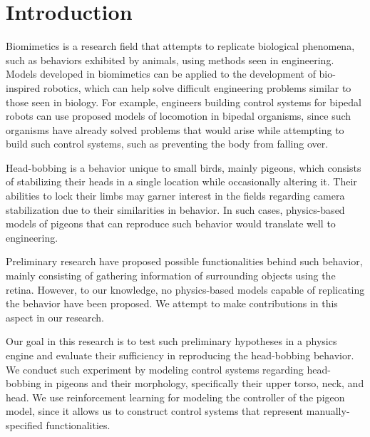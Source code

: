 \chapter{Introduction}
Biomimetics is a research field that attempts to replicate biological phenomena, such as behaviors exhibited by animals, using methods seen in engineering.
Models developed in biomimetics can be applied to the development of bio-inspired robotics, which can help solve difficult engineering problems similar to those seen in biology.
  For example, engineers building control systems for bipedal robots can use proposed models of locomotion in bipedal organisms, since such organisms have already solved problems that would arise while attempting to build such control systems, such as preventing the body from falling over.

Head-bobbing is a behavior unique to small birds, mainly pigeons, which consists of stabilizing their heads in a single location while occasionally altering it.
Their abilities to lock their limbs may garner interest in the fields regarding camera stabilization due to their similarities in behavior.
In such cases, physics-based models of pigeons that can reproduce such behavior would translate well to engineering.

Preliminary research have proposed possible functionalities behind such behavior, mainly consisting of gathering information of surrounding objects using the retina. However, to our knowledge, no physics-based models capable of replicating the behavior have been proposed. We attempt to make contributions in this aspect in our research.

Our goal in this research is to test such preliminary hypotheses in a physics engine and evaluate their sufficiency in reproducing the head-bobbing behavior.
We conduct such experiment by modeling control systems regarding head-bobbing in pigeons and their morphology, specifically their upper torso, neck, and head.
  We use reinforcement learning for modeling the controller of the pigeon model, since it allows us to construct control systems that represent manually-specified functionalities.

